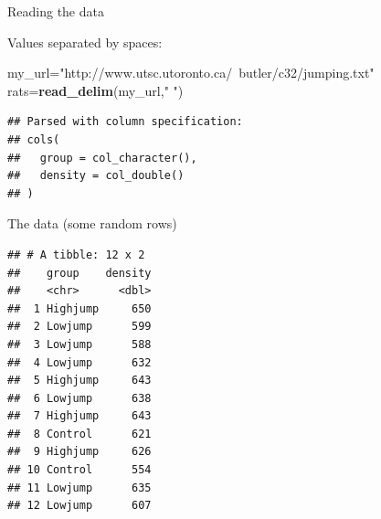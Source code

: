 \documentclass[
  ignorenonframetext,
]{beamer}
\newenvironment{Shaded}{\begin{snugshade}}{\end{snugshade}}
\newcommand{\DecValTok}[1]{\textcolor[rgb]{0.00,0.00,0.81}{#1}}
\newcommand{\KeywordTok}[1]{\textcolor[rgb]{0.13,0.29,0.53}{\textbf{#1}}}
\newcommand{\NormalTok}[1]{#1}
\newcommand{\OperatorTok}[1]{\textcolor[rgb]{0.81,0.36,0.00}{\textbf{#1}}}
\newcommand{\StringTok}[1]{\textcolor[rgb]{0.31,0.60,0.02}{#1}}
\begin{document}
\begin{frame}[fragile]{Reading the data}
\protect\hypertarget{reading-the-data}{}

Values separated by spaces:

\begin{Shaded}
\begin{Highlighting}[]
\NormalTok{my_url=}\StringTok{"http://www.utsc.utoronto.ca/~butler/c32/jumping.txt"}
\NormalTok{rats=}\KeywordTok{read_delim}\NormalTok{(my_url,}\StringTok{" "}\NormalTok{)}
\end{Highlighting}
\end{Shaded}

\begin{verbatim}
## Parsed with column specification:
## cols(
##   group = col_character(),
##   density = col_double()
## )
\end{verbatim}

\end{frame}

\begin{frame}[fragile]{The data (some random rows)}
\protect\hypertarget{the-data-some-random-rows}{}

\small

\begin{Shaded}
\end{Shaded}

\begin{verbatim}
## # A tibble: 12 x 2
##    group    density
##    <chr>      <dbl>
##  1 Highjump     650
##  2 Lowjump      599
##  3 Lowjump      588
##  4 Lowjump      632
##  5 Highjump     643
##  6 Lowjump      638
##  7 Highjump     643
##  8 Control      621
##  9 Highjump     626
## 10 Control      554
## 11 Lowjump      635
## 12 Lowjump      607
\end{verbatim}

\normalsize

\end{frame}
\end{document}
